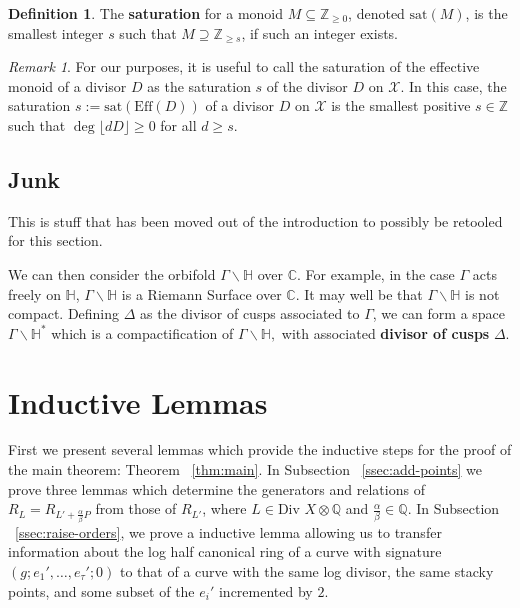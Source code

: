 \documentclass{amsart}
\theoremstyle{plain}
\theoremstyle{definition}
\newtheorem{defn}[thm]{Definition}
\theoremstyle{remark}
\newtheorem{rem}[thm]{Remark}
\numberwithin{equation}{section}
\newcommand\bh{{\mathbb H}}
\newcommand\BC{{\mathbb C}}
\newcommand\BQ{{\mathbb Q}}
\newcommand\BZ{{\mathbb Z}}
\newcommand \sx{\mathscr X}
\newcommand \di{\text{Div }}
\newcommand \halfcan{L}
\newcommand \Eff{\text{Eff}}
\newcommand \sat{\text{sat}}
\begin{document}
\begin{defn}
\label{defn:sat}
The \textbf{saturation} for a monoid $M \subseteq \BZ_{\geq 0}$,
denoted $\sat(M)$, is the smallest integer $s$ such that $M
\supseteq \BZ_{\geq s}$, if such an integer exists.
\end{defn}

\begin{rem}
For our purposes, it is useful to call the saturation of the
effective monoid of a divisor $D$ as the saturation $s$ of the
divisor $D$ on $\sx$. In this case, the saturation $s :=
\sat(\Eff(D))$ of a divisor $D$ on $\sx$ is the smallest positive
$s \in \BZ$ such that $\deg \lfloor dD \rfloor \geq 0$ for all $d
\geq s$.
\end{rem}

\subsection{Junk}
This is stuff that has been moved out of the introduction to possibly
be retooled for this section.

We can then consider the
orbifold $\Gamma \backslash \bh$ over $\BC$. For example, in the
case $\Gamma$ acts freely on $\bh$, $\Gamma \backslash \bh$ is a
Riemann Surface over $\BC$. It may well be that $\Gamma \backslash
\bh$ is not compact. Defining $\Delta$ as the divisor of cusps
associated to $\Gamma$, we can form a space $\Gamma \backslash
\bh^*$ which is a compactification of $\Gamma \backslash \bh,$ with
associated {\bf divisor of cusps} $\Delta$.



\section{Inductive Lemmas}
\label{sec:induction}
First we present several lemmas which provide the
inductive steps for the proof of the main theorem: Theorem
~\ref{thm:main}. In Subsection ~\ref{ssec:add-points} we prove three lemmas
which determine the generators and relations of $R_\halfcan=R_{\halfcan' + \frac{\alpha
}{\beta}P}$ from those of $R_{\halfcan'}$, where
$\halfcan \in \di
X \otimes \BQ $ and  $\frac{\alpha}{\beta} \in \BQ$. 
In
Subsection ~\ref{ssec:raise-orders}, we prove a inductive lemma allowing us to transfer information about the log half canonical ring of a curve with signature $(g; e_1', 
\ldots, e_\tau'; 0)$ to that of a
curve with the same log divisor, the same stacky points, and some subset of the $e_ i'$ incremented by $2$. 
\end{document}
